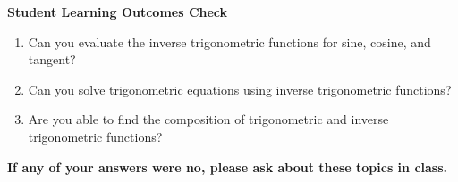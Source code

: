 \vfill
\noindent \textbf{Student Learning Outcomes Check}

\begin{enumerate}
\item Can you evaluate the inverse trigonometric functions for sine, cosine, and tangent?
\item Can you solve trigonometric equations using inverse trigonometric functions?
\item Are you able to find the composition of trigonometric and inverse trigonometric functions?

\end{enumerate}

\noindent \textbf{If any of your answers were no, please ask about these topics in class.}

